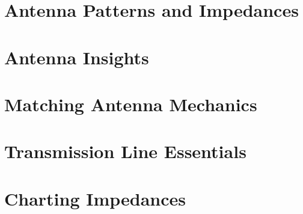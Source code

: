 \documentclass[12pt]{book}
\begin{document}
\section{Antenna Patterns and Impedances}














\section{Antenna Insights}












\section{Matching Antenna Mechanics}










\section{Transmission Line Essentials}












\section{Charting Impedances}











\end{document}
